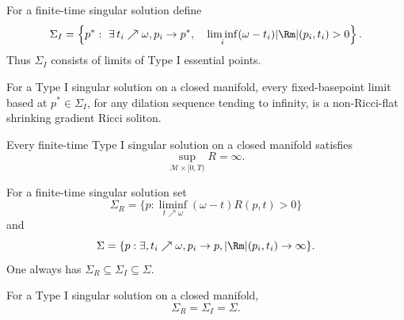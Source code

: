 \begin{definition}
\label{def:chow-iv-type-i-singular-point-set}
For a finite-time singular solution define
\[
 \Sigma_I=\left\{p^*:\ \exists\,t_i\nearrow\omega, p_i\to p^*,
 \quad\liminf_i(\omega-t_i)|\Rm|(p_i,t_i)>0\right\}.
\]
Thus \(\Sigma_I\) consists of limits of Type I essential points.
\end{definition}

\begin{theorem}
\label{thm:chow-iv-type-i-singular-point-limits-nonflat}
For a Type I singular solution on a closed manifold, every fixed-basepoint
limit based at \(p^*\in\Sigma_I\), for any dilation sequence tending to
infinity, is a non-Ricci-flat shrinking gradient Ricci soliton.
\end{theorem}

\begin{theorem}
\label{thm:chow-iv-type-i-singular-scalar-curvature-unbounded}
Every finite-time Type I singular solution on a closed manifold satisfies
\[
 \sup_{\mathcal M\times[0,T)}R=\infty.
\]
\end{theorem}

\begin{definition}
\label{def:chow-iv-singular-point-sets}
For a finite-time singular solution set
\[
 \Sigma_R=\{p:\liminf_{t\nearrow\omega}(\omega-t)R(p,t)>0\}
\]
and
\[
 \Sigma=\{p:\exists,t_i\nearrow\omega, p_i\to p,
 |\Rm|(p_i,t_i)\to\infty\}.
\]
One always has \(\Sigma_R\subseteq\Sigma_I\subseteq\Sigma\).
\end{definition}

\begin{theorem}
\label{thm:chow-iv-type-i-singular-point-sets-equal}
For a Type I singular solution on a closed manifold,
\[
 \Sigma_R=\Sigma_I=\Sigma.
\]
\end{theorem}

